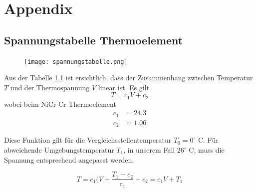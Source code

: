 \documentclass[a4paper,parskip,11pt, DIV12]{scrreprt}
\begin{document}
\clearpage



\chapter{Appendix}
\section{Spannungstabelle Thermoelement}
\label{Kacktabelle}
\begin{figure}[htbp]
\centering
\texttt{[image: spannungstabelle.png]}
\label{temp_cool}
\end{figure}
%
Aus der Tabelle \ref{Kacktabelle} ist ersichtlich, dass der Zusammenhang zwischen Temperatur $T$ und der Thermospannung $V$ linear ist. Es gilt
\begin{equation}
T = c_1 V + c_2
\end{equation}
wobei beim NiCr-Cr Thermoelement
\begin{align*}
c_1 &= 24.3\\
c_2 &= 1.06
\end{align*}
 
 Diese Funktion gilt für die Vergleichsstellentemperatur $T_0 = 0^{\circ}$ C. Für abweichende Umgebungstemperatur $T_1$, in unserem Fall $26^{\circ}$ C, muss die Spannung entsprechend angepasst werden.
 
 
 \begin{equation}
 T = c_1 (V+ \frac{T_1-c_2}{c_1}+c_2= c_1 V + T_1
 \end{equation}
 
 

\end{document}
